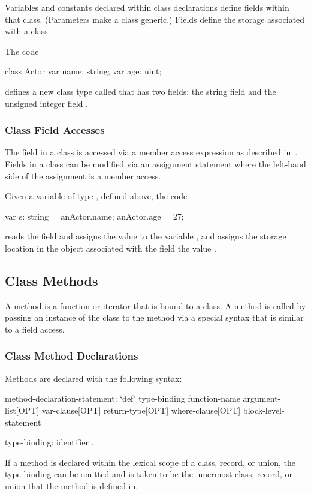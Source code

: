 Variables and constants declared within class declarations define
fields within that class.  (Parameters make a class generic.)  Fields
define the storage associated with a class.

\begin{example}
The code
\begin{chapel}
class Actor {
  var name: string;
  var age: uint;
}
\end{chapel}
defines a new class type called  that has two fields: the
string field  and the unsigned integer field .
\end{example}

\subsubsection{Class Field Accesses}
\label{Class_Field_Accesses}

The field in a class is accessed via a member access expression as
described in~.  Fields in a class can
be modified via an assignment statement where the left-hand side of
the assignment is a member access.
\begin{example}
Given a variable  of type , defined above,
the code
\begin{chapel}
var s: string = anActor.name;
anActor.age = 27;
\end{chapel}
reads the field  and assigns the value to the variable
, and assigns the storage location in the object
 associated with the field  the value
.
\end{example}

\subsection{Class Methods}
\label{Class_Methods}

A method is a function or iterator that is bound to a class.  A method
is called by passing an instance of the class to the method via a
special syntax that is similar to a field access.

\subsubsection{Class Method Declarations}
\label{Class_Method_Declarations}

Methods are declared with the following syntax:
\begin{syntax}
method-declaration-statement:
  `def' type-binding function-name argument-list[OPT] var-clause[OPT]
    return-type[OPT] where-clause[OPT] block-level-statement

type-binding:
  identifier .
\end{syntax}
If a method is declared within the lexical scope of a class, record,
or union, the type binding can be omitted and is taken to be the
innermost class, record, or union that the method is defined in.

